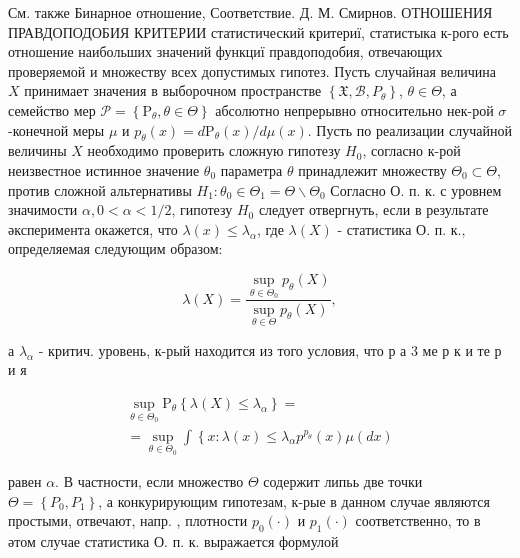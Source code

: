\documentclass[10pt]{article}
\begin{document}
См. также Бинарное отношение, Соответствие. Д. М. Смирнов. ОТНОШЕНИЯ ПРАВДОПОДОБИЯ КРИТЕРИИ статистический критериї, статистыка к-рого есть отношение наибольших значений функциї правдоподобия, отвечающих проверяемой и множеству всех допустимых гипотез. Пусть случайная величина $X$ принимает значения в выборочном пространстве $\left\{\mathfrak{X}, \mathscr{B}, P_{\theta}\right\}$, $\theta \in \Theta$, а семейство мер $\mathscr{P}=\left\{\mathrm{P}_{\theta}, \theta \in \Theta\right\}$ абсолютно непрерывно относительно нек-рой $\sigma$-конечной меры $\mu$ и $p_{\theta}(x)=d \mathrm{P}_{\theta}(x) / d \mu(x)$. Пусть по реализации случайной величины $X$ необходимо проверить сложную гипотезу $H_{0}$, согласно к-рой неизвестное истинное значение $\theta_{0}$ параметра $\theta$ принадлежит множеству $\Theta_{0} \subset \Theta$, против сложной альтернативы $H_{1}: \theta_{0} \in \Theta_{1}=\Theta \backslash \Theta_{0}$ Согласно О. п. к. с уровнем значимости $\alpha, 0<\alpha<1 / 2$, гипотезу $H_{0}$ следует отвергнуть, если в результате әксперимента окажется, что $\lambda(x) \leqslant \lambda_{\alpha}$, где $\lambda(X)$ - статистика О. п. к., определяемая следующим образом:



\[

\lambda(X)=\frac{\sup _{\theta \in \Theta_{0}} p_{\theta}(X)}{\sup _{\theta \in \Theta} p_{\theta}(X)},

\]



а $\lambda_{\alpha}$ - критич. уровень, к-рый находится из того условия, что р а 3 ме р к и те р и я



\[

\begin{gathered}

\sup _{\theta \in \Theta_{0}} \mathrm{P}_{\theta}\left\{\lambda(X) \leqslant \lambda_{\alpha}\right\}= \\

=\sup _{\theta \in \Theta_{0}} \int\left\{x: \lambda(x) \leqslant \lambda_{\alpha} p^{p_{\theta}}(x) \mu(d x)\right.

\end{gathered}

\]



равен $\alpha$. В частности, если множество $\Theta$ содержит липьь две точки $\Theta=\left\{P_{0}, P_{1}\right\}$, а конкурирующим гипотезам, к-рые в данном случае являются простыми, отвечают, напр. , плотности $p_{0}(\cdot)$ и $p_{1}(\cdot)$ соответственно, то в әтом случае статистика О. п. к. выражается формулой
\end{document}
